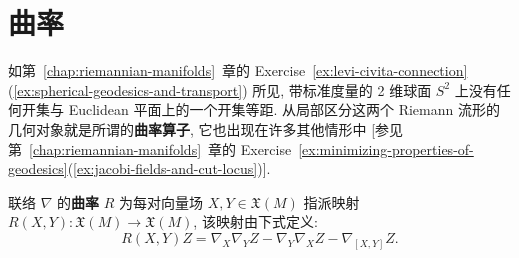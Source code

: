 \section{曲率}\label{sec:curvature}

如第~\ref{chap:riemannian-manifolds}~章的 Exercise~\ref{ex:levi-civita-connection}(\ref{ex:spherical-geodesics-and-transport}) 所见, 带标准度量的 2 维球面 $S^2$ 上没有任何开集与 Euclidean 平面上的一个开集等距. 从局部区分这两个 Riemann 流形的几何对象就是所谓的\textbf{曲率算子}, 它也出现在许多其他情形中 [参见第~\ref{chap:riemannian-manifolds}~章的 Exercise~\ref{ex:minimizing-properties-of-geodesics}(\ref{ex:jacobi-fields-and-cut-locus})].

\begin{RiemannDefinition}\label{def:curvature-of-connection}
联络 $\nabla$ 的\textbf{曲率} $R$ 为每对向量场 $X,Y\in\mathfrak{X}(M)$ 指派映射 $R(X,Y):\mathfrak{X}(M)\to\mathfrak{X}(M)$, 该映射由下式定义:
\[
  R(X,Y)Z=\nabla_X\nabla_YZ-\nabla_Y\nabla_XZ-\nabla_{[X,Y]}Z.
\]
\end{RiemannDefinition}

